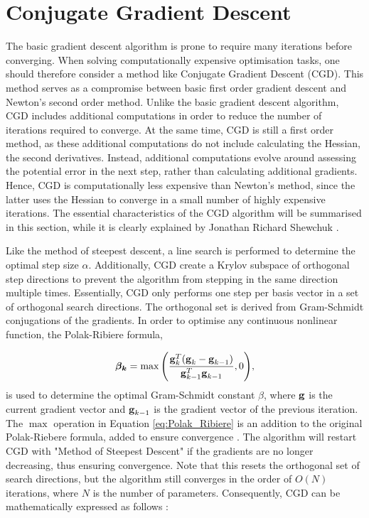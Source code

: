 \section{Conjugate Gradient Descent}\label{sec:theory_CGD}
\noindent
The basic gradient descent algorithm is prone to require many iterations before converging.
When solving computationally expensive optimisation tasks,
one should therefore consider a method like Conjugate Gradient Descent (CGD).
This method serves as a compromise between basic first order gradient descent and Newton's second order method.
Unlike the basic gradient descent algorithm, CGD includes additional computations in order to reduce the number of iterations required to converge.
At the same time, CGD is still a first order method, as these additional computations do not include calculating the Hessian, the second derivatives.
Instead, additional computations evolve around assessing the potential error in the next step, rather than calculating additional gradients.
Hence, CGD is computationally less expensive than Newton's method, since
the latter uses the Hessian to converge in a small number of highly expensive iterations.
The essential characteristics of the CGD algorithm will be summarised in this section, while it is clearly explained by Jonathan Richard Shewchuk \cite{shewchuk1994introduction}.

Like the method of steepest descent, a line search is performed to determine the optimal step size $\alpha$.
Additionally, CGD create a Krylov subspace of orthogonal step directions to prevent the algorithm from stepping in the same direction multiple times.
Essentially, CGD only performs one step per basis vector in a set of orthogonal search directions.
The orthogonal set is derived from Gram-Schmidt conjugations of the gradients.
In order to optimise any continuous nonlinear function, the Polak-Ribiere formula,

\begin{equation}\label{eq:Polak_Ribiere}
    \mathrm{\boldsymbol{\beta_{k}}} = \max{ \left( \frac{\bm{\mathrm{g}}^T_{k}(\bm{\mathrm{g}}_{k} - \bm{\mathrm{g}}_{k-1})}{\bm{\mathrm{g}}^T_{k-1} \bm{\mathrm{g}}_{k-1}}, 0 \right) },
\end{equation}
\noindent
is used to determine the optimal Gram-Schmidt constant $\beta$,
where $\bm{\mathrm{g}}$ is the current gradient vector and $\bm{\mathrm{g}}_{k-1}$ is the gradient vector of the previous iteration.
The $\max$ operation in Equation \eqref{eq:Polak_Ribiere} is an addition to the original Polak-Riebere formula, added to ensure convergence \cite{shewchuk1994introduction}.
The algorithm will restart CGD with "Method of Steepest Descent" if the gradients are no longer decreasing, thus ensuring convergence.
Note that this resets the orthogonal set of search directions, but the algorithm still converges in the order of $O(N)$ iterations, where $N$ is the number of parameters.
Consequently, CGD can be mathematically expressed as follows \cite{shewchuk1994introduction}:



